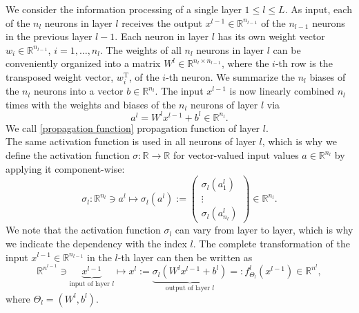 We consider the information processing of a single layer $1 \leq l \leq L$. As input, each of the $n_l$ neurons in layer $l$ receives the output $x^{l-1} \in \mathbb{R}^{n_{l-1}}$ of the $n_{l-1}$ neurons in the previous layer $l-1$. Each neuron in layer $l$ has its own weight vector $w_i \in \mathbb{R}^{n_{l-1}}$, $i = 1, \ldots, n_l$. The weights of all $n_l$ neurons in layer $l$ can be conveniently organized into a matrix $W^l \in \mathbb{R}^{n_l \times n_{l-1}}$, where the $i$-th row is the transposed weight vector, $w^{\mathrm{T}}_i$, of the $i$-th neuron. We summarize the $n_l$ biases of the $n_l$ neurons into a vector $b \in \mathbb{R}^{n_l}$. The input $x^{l-1}$ is now linearly combined $n_l$ times with the weights and biases of the $n_l$ neurons of layer $l$ via 
\begin{equation}
    \label{propagation function}
    a^l = W^l x^{l-1} + b^l \in \mathbb{R}^{n_l}.
\end{equation}
We call \cref{propagation function} propagation function of layer $l$. \\
The same activation function is used in all neurons of layer $l$, which is why we define the activation function $\sigma \colon \mathbb{R} \to \mathbb{R}$ for vector-valued input values $a \in \mathbb{R}^{n_l}$ by applying it component-wise:
\begin{equation*}
    \sigma_l \colon \mathbb{R}^{n_l} \ni a^l \mapsto \sigma_l (a^l):= \left(
        \begin{array}
            {c} \sigma_l \left( a^l_{1} \right) \\
            \vdots \\
            \sigma_l \left( a^l_{n_l} \right)
        \end{array}
        \right) \in \mathbb{R}^{n_l}.
\end{equation*}
We note that the activation function $\sigma_l$ can vary from layer to layer, which is why we indicate the dependency with the index $l$. The complete transformation of the input $x^{l-1} \in \mathbb{R}^{n_{l-1}}$ in the $l$-th layer can then be written as
\begin{equation}
    \label{action layer}
    \mathbb{R}^{n^{l-1}} \ni \underbrace{x^{l-1}}_{\text{input of layer } l} \mapsto x^{l}:=\underbrace{\sigma_{l}\left( W^{l} x^{l-1} + b^{l} \right)}_{\text{output of layer } l}=: f^{l}_{\Theta_l} \left( x^{l-1} \right) \in \mathbb{R}^{n^{l}}, 
\end{equation}
where $\Theta_l = (W^{l}, b^{l})$. \\

